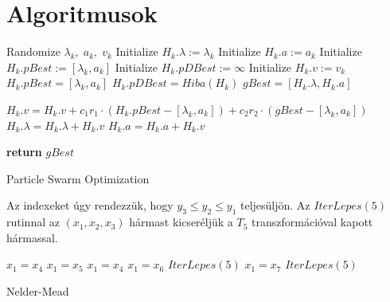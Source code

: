 \documentclass[oneside,titlepage,12pt,a4paper]{report}
\begin{document}
\chapter{Algoritmusok}
\label{chp:alg}
\begin{algorithm}[htp] 
\begin{algorithmic}[1]
		\State Randomize $\lambda_k,\; a_k, \; v_k$	 		
		\State Initialize $H_k.\lambda:=\lambda_k$ 
		\State Initialize $H_k.a:=a_k$			
		\State Initialize $H_k.pBest:=[\lambda_k, a_k]$    
		\State Initialize $H_k.pDBest:=\infty$   
		\State Initialize $H_k.v:=v_k$   
	\EndFor
			  
				\State $H_k.pBest=[\lambda_k, a_k]$
				\State $H_k.pDBest= Hiba(H_k)$
			\EndIf
		\EndFor		
		  
				\State $gBest=[H_k.\lambda, H_k.a]$
			\EndIf

							
			\State $H_k.v = H_k.v + c_1 r_1 \cdot (H_k.pBest-[\lambda_k, a_k]) 
						 + c_2 r_2 \cdot (gBest-[\lambda_k, a_k])$ 
			\State $H_k.\lambda = H_k.\lambda + H_k.v$	
			\State $H_k.a = H_k.a + H_k.v$
			
		\EndFor					
	\EndFor
	\State \textbf{return} $gBest$
	\EndFunction
\end{algorithmic}
\caption{Particle Swarm Optimization}
\label{alg:pso}
\end{algorithm}
\newpage
Az indexeket \'ugy rendezz\"uk, hogy
$y_3\le y_2\le y_1$ teljes\"ulj\"on. Az $IterLepes(5)$ rutinnal az 
$(x_1,x_2,x_3)$ h\'armast kicser\'elj\"uk a $T_5$ transzform\'aci\'oval kapott
h\'armassal.
\bigskip

\begin{algorithm}[htb!] 
\begin{algorithmic}[1]
		\State $x_1 = x_4$
			\State $x_1 = x_5$
		\Else
			\State $x_1 = x_4$
		\EndIf
				\State $x_1 = x_6$
			\Else
				\State $IterLepes(5)$
			\EndIf
				\State $x_1 = x_7$
			\Else
				\State $IterLepes(5)$
			\EndIf
		\EndIf
	\EndIf
	\EndFunction
\end{algorithmic}
\caption{Nelder-Mead}
\label{alg:NM}
\end{algorithm}
\end{document}

